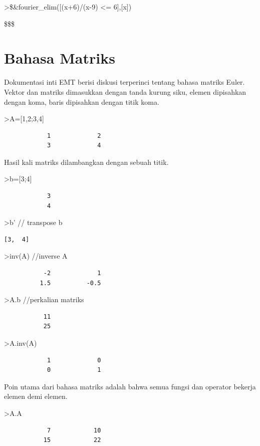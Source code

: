 \documentclass[
]{book}
\begin{document}
\textgreater\$\&fourier\_elim({[}(x+6)/(x-9) \textless= 6{]},{[}x{]})

\$\left[ x=12 \right] \lor \left[ 12<x \right] \lor \left[ x<9   \right] \$\$

\section{Bahasa Matriks}\label{bahasa-matriks}

Dokumentasi inti EMT berisi diskusi terperinci tentang bahasa matriks Euler. Vektor dan matriks dimasukkan dengan tanda kurung siku, elemen dipisahkan dengan koma, baris dipisahkan dengan titik koma.

\textgreater A={[}1,2;3,4{]}

\begin{verbatim}
            1             2 
            3             4 
\end{verbatim}

Hasil kali matriks dilambangkan dengan sebuah titik.

\textgreater b={[}3;4{]}

\begin{verbatim}
            3 
            4 
\end{verbatim}

\textgreater b' // transpose b

\begin{verbatim}
[3,  4]
\end{verbatim}

\textgreater inv(A) //inverse A

\begin{verbatim}
           -2             1 
          1.5          -0.5 
\end{verbatim}

\textgreater A.b //perkalian matriks

\begin{verbatim}
           11 
           25 
\end{verbatim}

\textgreater A.inv(A)

\begin{verbatim}
            1             0 
            0             1 
\end{verbatim}

Poin utama dari bahasa matriks adalah bahwa semua fungsi dan operator bekerja elemen demi elemen.

\textgreater A.A

\begin{verbatim}
            7            10 
           15            22 
\end{verbatim}
\end{document}

